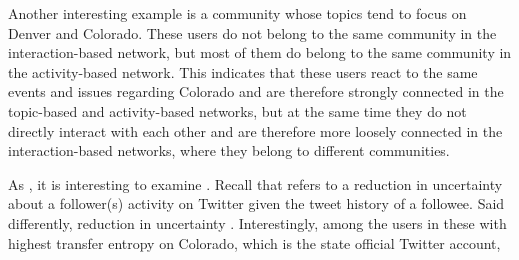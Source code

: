 Another interesting example is a community whose topics tend to focus on Denver and Colorado. These users do not belong to the same community in the interaction-based network, but most of them do belong to the same community in the activity-based network. This indicates that these users react to the same events and issues regarding Colorado and are therefore strongly connected in the topic-based and activity-based networks, but at the same time they do not directly interact with each other and are therefore more loosely connected in the interaction-based networks, where they belong to different communities.

As \DIFdelbegin {}\DIFdelend \DIFaddbegin {}\DIFaddend , it is interesting to examine \DIFdelbegin {}\DIFdelend \DIFaddbegin {}\DIFaddend . Recall that \DIFdelbegin {}\DIFdelend \DIFaddbegin {}\DIFaddend refers to a reduction in uncertainty about a follower(s) activity on Twitter given the tweet history of a followee. Said differently, \DIFdelbegin {}\DIFdelend \DIFaddbegin {}\DIFaddend reduction in uncertainty \DIFdelbegin {}\DIFdelend \DIFaddbegin {}\DIFaddend . Interestingly, among the \DIFdelbegin {}\DIFdelend \DIFaddbegin {}\DIFaddend users in these \DIFdelbegin {}\DIFdelend \DIFaddbegin {}\DIFaddend with highest transfer entropy on \DIFdelbegin {}%
\DIFdelend \DIFaddbegin {}\DIFaddend Colorado, which is the state official Twitter account, \DIFdelbegin %
